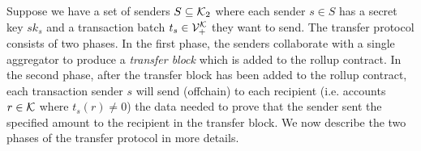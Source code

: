 Suppose we have a set of senders \(S \subseteq \mathcal{K}_2\) where each sender \(s \in S\) has a secret key \(sk_s\) and a transaction batch \(t_s \in \mathcal{V}_+^{\mathcal{K}}\) they want to send. The transfer protocol consists of two phases. In the first phase, the senders collaborate with a single aggregator to produce a \emph{transfer block} which is added to the rollup contract. In the second phase, after the transfer block has been added to the rollup contract, each transaction sender \(s\) will send (offchain) to each recipient (i.e. accounts \(r \in \mathcal{K}\) where \(t_s(r) \neq 0\)) the data needed to prove that the sender sent the specified amount to the recipient in the transfer block. We now describe the two phases of the transfer protocol in more details.





